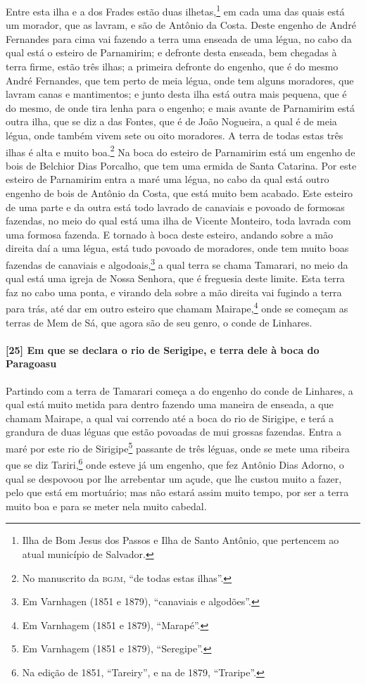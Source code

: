 \begin{linenumbers}
Entre esta ilha e a dos Frades estão duas ilhetas,\footnote{ Ilha de Bom Jesus dos Passos
e Ilha de Santo Antônio, que pertencem ao atual município de Salvador.} em cada uma das
quais está um morador, que as lavram, e são de Antônio da Costa. Deste engenho de André
Fernandes para cima vai fazendo a terra uma enseada de uma légua, no cabo da qual está o
esteiro de Parnamirim; e defronte desta enseada, bem chegadas à terra firme, estão três
ilhas; a primeira defronte do engenho, que é do mesmo André Fernandes, que tem perto de
meia légua, onde tem alguns moradores, que lavram canas e mantimentos; e junto desta ilha
está outra mais pequena, que é do mesmo, de onde tira lenha para o engenho; e mais avante
de Parnamirim está outra ilha, que se diz a das Fontes, que é de João Nogueira, a qual é
de meia légua, onde também vivem sete ou oito moradores. A terra de todas estas três ilhas
é alta e muito boa.\footnote{ No manuscrito da \textsc{bgjm}, ``de todas estas ilhas''.}
Na boca do esteiro de Parnamirim está um engenho de bois de Belchior Dias Porcalho, que
tem uma ermida de Santa Catarina. Por este esteiro de Parnamirim entra a maré uma légua,
no cabo da qual está outro engenho de bois de Antônio da Costa, que está muito bem
acabado. Este esteiro de uma parte e da outra está todo lavrado de canaviais e povoado de
formosas fazendas, no meio do qual está uma ilha de Vicente Monteiro, toda lavrada com uma
formosa fazenda. E tornado à boca deste esteiro, andando sobre a mão direita daí a uma
légua, está tudo povoado de moradores, onde tem muito boas fazendas de canaviais e
algodoais,\footnote{ Em Varnhagen (1851 e 1879), ``canaviais e algodões''.} a qual terra
se chama Tamarari, no meio da qual está uma igreja de Nossa Senhora, que é freguesia deste
limite. Esta terra faz no cabo uma ponta, e virando dela sobre a mão direita vai fugindo a
terra para trás, até dar em outro esteiro que chamam Mairape,\footnote{ Em Varnhagem (1851
e 1879), ``Marapé''.} onde se começam as terras de Mem de Sá, que agora são de seu genro,
o conde de Linhares.

\paragraph{[25] Em que se declara o rio de Serigipe, e terra dele à boca do Paragoasu}\quad
Partindo com a terra de Tamarari começa a do engenho do conde de Linhares, a qual está
muito metida para dentro fazendo uma maneira de enseada, a que chamam Mairape, a qual vai
correndo até a boca do rio de Sirigipe, e terá a grandura de duas léguas que estão
povoadas de mui grossas fazendas. Entra a maré por este rio de Sirigipe\footnote{ Em
Varnhagem (1851 e 1879), ``Seregipe''.} passante de três léguas, onde se mete uma ribeira
que se diz Tariri,\footnote{ Na edição de 1851, ``Tareiry'', e na de 1879, ``Traripe''.}
onde esteve já um engenho, que fez Antônio Dias Adorno, o qual se despovoou por lhe
arrebentar um açude, que lhe custou muito a fazer, pelo que está em mortuário;
mas não estará assim muito tempo, por ser a terra muito boa e
para se meter nela muito cabedal.


\end{linenumbers}
